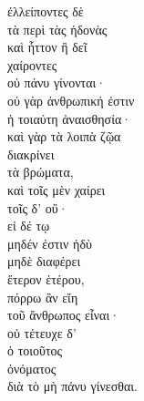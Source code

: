 {\large
\begin{greek}
\noindent  ἐλλείποντες δὲ \\
\tabto{2em} τὰ περὶ τὰς ἡδονὰς \\
καὶ ἧττον ἢ δεῖ \\
\tabto{2em} χαίροντες \\
οὐ πάνυ γίνονται· \\
οὐ γὰρ ἀνθρωπική ἐστιν \\
\tabto{2em} ἡ τοιαύτη ἀναισθησία· \\
καὶ γὰρ τὰ λοιπὰ ζῷα \\
\tabto{2em} διακρίνει \\
\tabto{4em} τὰ βρώματα, \\
\tabto{2em} καὶ τοῖς μὲν χαίρει \\
\tabto{2em} τοῖς δ' οὔ· \\
εἰ δέ τῳ \\
\tabto{2em} μηδέν ἐστιν ἡδὺ \\
\tabto{2em} μηδὲ διαφέρει \\
\tabto{4em} ἕτερον ἑτέρου, \\
πόρρω ἂν εἴη \\
\tabto{2em} τοῦ ἄνθρωπος εἶναι· \\
οὐ τέτευχε δ' \\
ὁ τοιοῦτος \\
\tabto{2em} ὀνόματος \\
\tabto{4em} διὰ τὸ μὴ πάνυ γίνεσθαι. \\

\end{greek}
}

